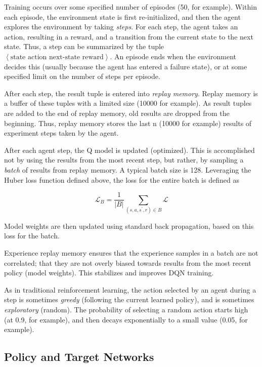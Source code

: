 \documentclass[acmlarge,screen]{acmart}
\begin{document}
Training occurs over some specified number of episodes (50, for example).
Within each episode, the environment state is first re-initialized, and then the agent explores the environment by taking
\textit{steps}.
For each step, the agent takes an action, resulting in a reward, and a transition from the current state to the next state.
Thus, a step can be summarized by the tuple $\left< \text{state action next-state reward} \right>$.
An episode ends when the environment decides this (usually because the agent has entered a failure state), 
or at some specified limit on the number of steps per episode.

After each step, the result tuple is entered into \textit{replay memory}.  
Replay memory is a buffer of these tuples with a limited size (10000 for example).
As result tuples are added to the end of replay memory, old results are dropped from the beginning.
Thus, replay memory stores the last n (10000 for example) results of experiment steps taken by the agent.

After each agent step, the Q model is updated (optimized).
This is accomplished not by using the results from the most recent step, but rather, by sampling a \textit{batch}
of results from replay memory. 
A typical batch size is 128.
Leveraging the Huber loss function defined above, the loss for the entire batch is defined as

\begin{equation}  \label{eq:batchloss}
  \mathcal{L}_B = \frac{1}{\lvert B \rvert} \sum_{ \left( s,a,s^\prime , r \right) \in B}  \mathcal{L}
\end{equation}

\noindent Model weights are then updated using standard back propagation, based on this loss for the batch.

Experience replay memory ensures that the experience samples in a batch are not correlated;
that they are not overly biased towards results from the most recent policy (model weights).
This stabilizes and improves DQN training.

As in traditional reinforcement learning, the action selected by an agent during a step is sometimes 
\textit{greedy} (following the current learned policy), and is sometimes \textit{exploratory} (random).
The probability of selecting a random action starts high (at 0.9, for example), and then decays exponentially to
a small value (0.05, for example).



\subsection{Policy and Target Networks}
\end{document}

